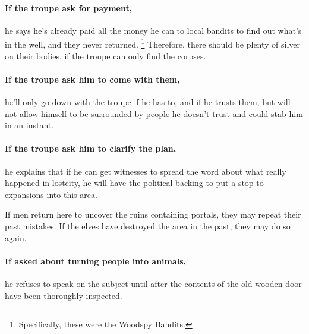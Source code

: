 \paragraph{If the troupe ask for payment,}
he says he's already paid all the money he can to local bandits to find out what's in the well, and they never returned.%
\footnote{Specifically, these were the Woodspy Bandits.}
Therefore, there should be plenty of silver on their bodies, if the troupe can only find the corpses.

\paragraph{If the troupe ask him to come with them,}
he'll only go down with the troupe if he has to, and if he trusts them, but will not allow himself to be surrounded by people he doesn't trust and could stab him in an instant.

\forestpriest

\paragraph{If the troupe ask him to clarify the plan,}
he explains that if he can get witnesses to spread the word about what really happened in \gls{lostcity}, he will have the political backing to put a stop to expansions into this area.

If men return here to uncover the ruins containing portals, they may repeat their past mistakes.
If the elves have destroyed the area in the past, they may do so again.

\paragraph{If asked about turning people into animals,}
he refuses to speak on the subject until after the contents of the old wooden door have been thoroughly inspected.


